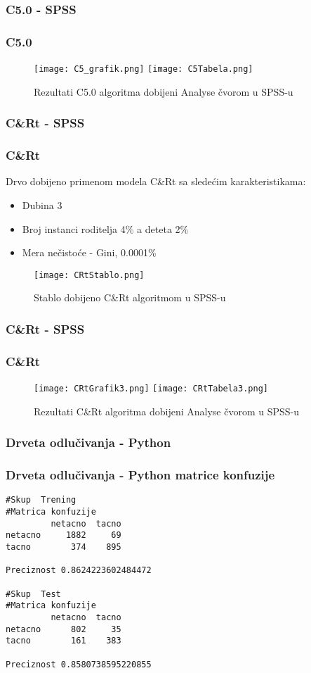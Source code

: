 \documentclass{beamer}
\begin{document}
\subsubsection*{C5.0 - SPSS}
\begin{frame}[fragile]
\frametitle{C5.0}
\begin{figure}
\texttt{[image: C5\_grafik.png]}
\texttt{[image: C5Tabela.png]}
\caption{Rezultati C5.0 algoritma dobijeni Analyse čvorom u SPSS-u}
\end{figure}
\end{frame}

\subsubsection*{C\&Rt - SPSS}
\begin{frame}[fragile]
\frametitle{C\&Rt}
Drvo dobijeno primenom modela C\&Rt sa sledećim karakteristikama: 
\begin{itemize}
 \item Dubina 3
 \item Broj instanci roditelja 4\% a deteta 2\%
 \item Mera nečistoće - Gini, 0.0001\% 
\end{itemize} 
\begin{figure}
\texttt{[image: CRtStablo.png]}
\caption{Stablo dobijeno C\&Rt algoritmom u SPSS-u}
\end{figure}
\end{frame}

\subsubsection*{C\&Rt - SPSS}
\begin{frame}[fragile]
\frametitle{C\&Rt}
\begin{figure}
\texttt{[image: CRtGrafik3.png]}
\texttt{[image: CRtTabela3.png]}
\caption{Rezultati C\&Rt algoritma dobijeni Analyse čvorom u SPSS-u}
\end{figure}
\end{frame}

\subsubsection*{Drveta odlučivanja - Python}
\begin{frame}[fragile]
\frametitle{Drveta odlučivanja - Python matrice konfuzije}
\begin{lstlisting}
#Skup  Trening
#Matrica konfuzije
         netacno  tacno
netacno     1882     69
tacno        374    895

Preciznost 0.8624223602484472

#Skup  Test
#Matrica konfuzije
         netacno  tacno
netacno      802     35
tacno        161    383

Preciznost 0.8580738595220855
\end{lstlisting}
\end{frame}
\end{document}
